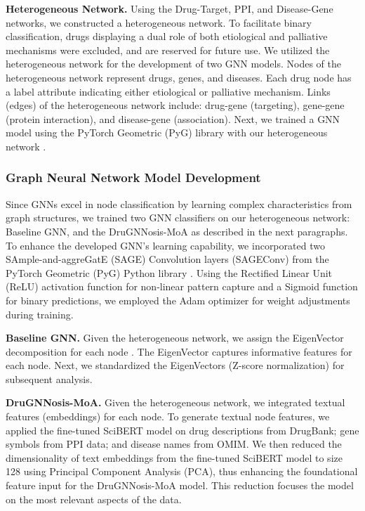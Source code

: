 \documentclass[journal,twoside,web]{ieeecolor}
\begin{document}
\noindent\textbf{Heterogeneous Network.}
Using the Drug-Target, PPI, and Disease-Gene networks, we constructed a heterogeneous network.
To facilitate binary classification, drugs displaying a dual role of both etiological and palliative mechanisms were excluded, and are reserved for future use.
We utilized the heterogeneous network for the development of two GNN models.
Nodes of the heterogeneous network represent drugs, genes, and diseases.
Each drug node has a label attribute indicating either etiological or palliative mechanism.
Links (edges) of the heterogeneous network include: drug-gene (targeting), gene-gene (protein interaction), and disease-gene (association).
Next, we trained a GNN model using the PyTorch Geometric (PyG) library with our heterogeneous network \cite{Fey/Lenssen/2019}.

\subsubsection{Graph Neural Network Model Development}
\label{sec:model}
Since GNNs excel in node classification by learning complex characteristics from graph structures, we trained two GNN classifiers on our heterogeneous network: Baseline GNN, and the DruGNNosis-MoA as described in the next paragraphs. 
To enhance the developed GNN's learning capability, we incorporated two SAmple-and-aggreGatE (SAGE) Convolution layers (SAGEConv) \cite{hamilton2018inductive} from the PyTorch Geometric (PyG) Python library \cite{Fey/Lenssen/2019}.
Using the Rectified Linear Unit (ReLU) activation function \cite{shang2016understanding} for non-linear pattern capture and a Sigmoid function \cite{vlačić2020neural} for binary predictions, we employed the Adam optimizer \cite{kingma2014adam} for weight adjustments during training. 

\textbf{Baseline GNN.}
Given the heterogeneous network, we assign the EigenVector decomposition for each node \cite{huang2020combining}.
The EigenVector captures informative features for each node.
Next, we standardized the EigenVectors (Z-score normalization) for subsequent analysis.

\textbf{DruGNNosis-MoA.}
Given the heterogeneous network, we integrated textual features (embeddings) for each node.
To generate textual node features, we applied the fine-tuned SciBERT model on drug descriptions from DrugBank; gene symbols from PPI data; and disease names from OMIM.
We then reduced the dimensionality of text embeddings from the fine-tuned SciBERT model to size 128 using Principal Component Analysis (PCA), thus enhancing the foundational feature input for the DruGNNosis-MoA model.
This reduction focuses the model on the most relevant aspects of the data.
\end{document}
